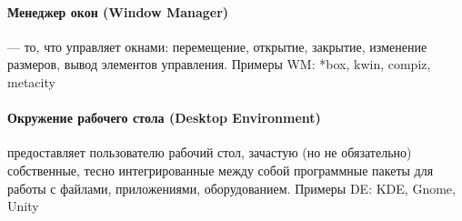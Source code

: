 \paragraph{Менеджер окон (Window Manager)} --- то, что управляет окнами: перемещение, открытие, закрытие, изменение размеров, вывод элементов управления. Примеры WM: *box, kwin, compiz, metacity

\paragraph{Окружение рабочего стола (Desktop Environment)} предоставляет пользователю рабочий стол, зачастую (но не обязательно) собственные, тесно интегрированные между собой программные пакеты для работы с файлами, приложениями, оборудованием. Примеры DE: KDE, Gnome, Unity
